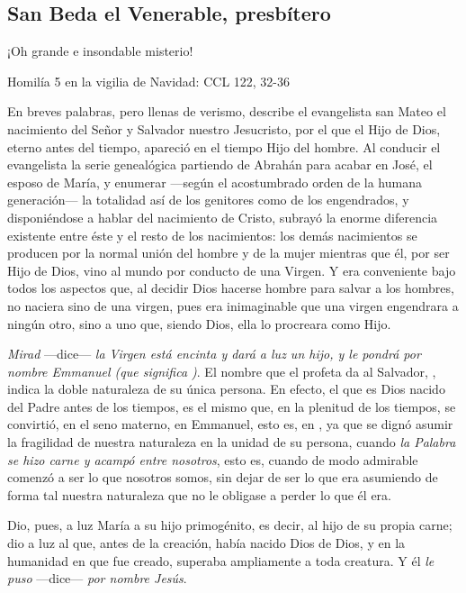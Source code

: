 \subsection{San Beda el Venerable, presbítero}

¡Oh grande e insondable misterio!

Homilía 5 en la vigilia de Navidad: CCL 122, 32-36

En breves palabras, pero llenas de verismo, describe el evangelista san Mateo el nacimiento del Señor y Salvador nuestro Jesucristo, por el que el Hijo de Dios, eterno antes del tiempo, apareció en el tiempo Hijo del hombre. Al conducir el evangelista la serie genealógica partiendo de Abrahán para acabar en José, el esposo de María, y enumerar ---según el acostumbrado orden de la humana generación--- la totalidad así de los genitores como de los engendrados, y disponiéndose a hablar del nacimiento de Cristo, subrayó la enorme diferencia existente entre éste y el resto de los nacimientos: los demás nacimientos se producen por la normal unión del hombre y de la mujer mientras que él, por ser Hijo de Dios, vino al mundo por conducto de una Virgen. Y era conveniente bajo todos los aspectos que, al decidir Dios hacerse hombre para salvar a los hombres, no naciera sino de una virgen, pues era inimaginable que una virgen engendrara a ningún otro, sino a uno que, siendo Dios, ella lo procreara como Hijo.

\emph{Mirad} ---dice--- \emph{la Virgen está encinta y dará a luz un hijo, y le pondrá por nombre Emmanuel (que significa )}. El nombre que el profeta da al Salvador, , indica la doble naturaleza de su única persona. En efecto, el que es Dios nacido del Padre antes de los tiempos, es el mismo que, en la plenitud de los tiempos, se convirtió, en el seno materno, en Emmanuel, esto es, en , ya que se dignó asumir la fragilidad de nuestra naturaleza en la unidad de su persona, cuando \emph{la Palabra se hizo carne y acampó entre nosotros}, esto es, cuando de modo admirable comenzó a ser lo que nosotros somos, sin dejar de ser lo que era asumiendo de forma tal nuestra naturaleza que no le obligase a perder lo que él era.

Dio, pues, a luz María a su hijo primogénito, es decir, al hijo de su propia carne; dio a luz al que, antes de la creación, había nacido Dios de Dios, y en la humanidad en que fue creado, superaba ampliamente a toda creatura. Y él \emph{le puso} ---dice--- \emph{por nombre Jesús}.

